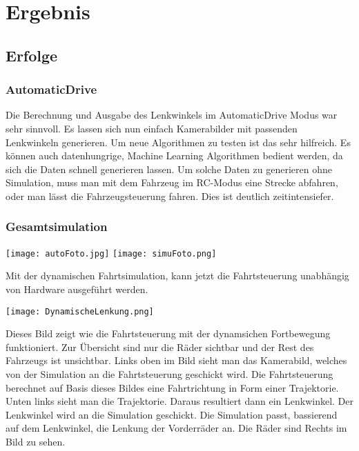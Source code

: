 
\chapter{Ergebnis}


\section{Erfolge}

\subsection*{AutomaticDrive}
Die Berechnung und Ausgabe des Lenkwinkels im AutomaticDrive Modus war sehr sinnvoll.
Es lassen sich nun einfach Kamerabilder mit passenden Lenkwinkeln generieren.
Um neue Algorithmen zu testen ist das sehr hilfreich.
Es können auch datenhungrige, Machine Learning Algorithmen bedient werden, da sich die Daten schnell generieren lassen.
Um solche Daten zu generieren ohne Simulation, muss man mit dem Fahrzeug im RC-Modus eine Strecke abfahren, oder man lässt die Fahrzeugsteuerung fahren.
Dies ist deutlich zeitintensiefer.   
\subsection*{Gesamtsimulation}
\begin{center}
    \texttt{[image: autoFoto.jpg]}
    \texttt{[image: simuFoto.png]}
\end{center}
Mit der dynamischen Fahrtsimulation, kann jetzt die Fahrtsteuerung unabhängig von Hardware ausgeführt werden.


\begin{center}
    \texttt{[image: DynamischeLenkung.png]}
\end{center}
Dieses Bild zeigt wie die Fahrtsteuerung mit der dynamsichen Fortbewegung funktioniert.
Zur Übersicht sind nur die Räder sichtbar und der Rest des Fahrzeugs ist unsichtbar.
Links oben im Bild sieht man das Kamerabild, welches von der Simulation an die Fahrtsteuerung geschickt wird.
Die Fahrtsteuerung berechnet auf Basis dieses Bildes eine Fahrtrichtung in Form einer Trajektorie.
Unten links sieht man die Trajektorie. Daraus resultiert dann ein Lenkwinkel. 
Der Lenkwinkel wird an die Simulation geschickt. 
Die Simulation passt, bassierend auf dem Lenkwinkel, die Lenkung der Vorderräder an.
Die Räder sind Rechts im Bild zu sehen.


